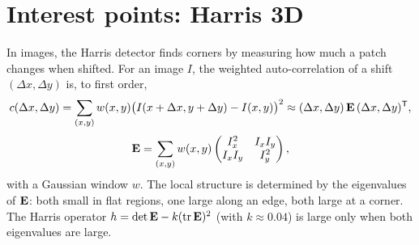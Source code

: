 \section{Interest points: Harris 3D}

In images, the Harris detector \citep{Harris1988} finds corners by measuring how much a patch
changes when shifted. For an image $I$, the weighted auto-correlation of a shift $(\Delta x,\Delta
y)$ is, to first order,
\begin{equation}
c(\Delta x,\Delta y)=\sum_{(x,y)}w(x,y)\bigl(I(x+\Delta x,y+\Delta y)-I(x,y)\bigr)^2\approx
(\Delta x,\Delta y)\,\mathbf{E}\,(\Delta x,\Delta y)^{\mathsf{T}} ,
\end{equation}
\begin{equation}
\mathbf{E}=\sum_{(x,y)}w(x,y)\begin{pmatrix}I_x^2&I_xI_y\\I_xI_y&I_y^2\end{pmatrix},
\end{equation}
with a Gaussian window $w$. The local structure is determined by the eigenvalues of $\mathbf{E}$: both
small in flat regions, one large along an edge, both large at a corner. The Harris operator
$h=\det\mathbf{E}-k(\operatorname{tr}\mathbf{E})^2$ (with $k\approx0.04$) is large only when both eigenvalues are large.

